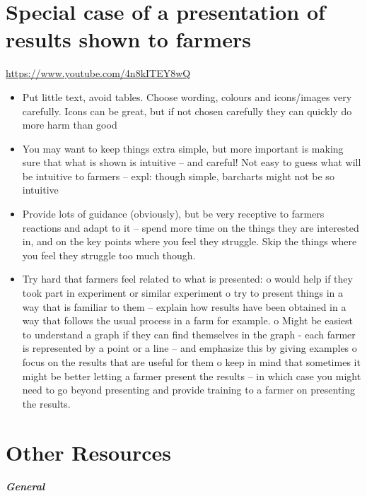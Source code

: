 \documentclass[
]{book}
\providecommand{\tightlist}{%
  \setlength{\itemsep}{0pt}\setlength{\parskip}{0pt}}
\begin{document}
\hypertarget{special-case-of-a-presentation-of-results-shown-to-farmers}{%
\section{Special case of a presentation of results shown to farmers}\label{special-case-of-a-presentation-of-results-shown-to-farmers}}

\label{fig:unnamed-chunk-33}\url{https://www.youtube.com/4n8kITEY8wQ}

\begin{itemize}
\tightlist
\item
  Put little text, avoid tables. Choose wording, colours and icons/images very carefully. Icons can be great, but if not chosen carefully they can quickly do more harm than good
\item
  You may want to keep things extra simple, but more important is making sure that what is shown is intuitive -- and careful! Not easy to guess what will be intuitive to farmers -- expl: though simple, barcharts might not be so intuitive
\item
  Provide lots of guidance (obviously), but be very receptive to farmers reactions and adapt to it -- spend more time on the things they are interested in, and on the key points where you feel they struggle. Skip the things where you feel they struggle too much though.
\item
  Try hard that farmers feel related to what is presented:
  o would help if they took part in experiment or similar experiment
  o try to present things in a way that is familiar to them -- explain how results have been obtained in a way that follows the usual process in a farm for example.
  o Might be easiest to understand a graph if they can find themselves in the graph - each farmer is represented by a point or a line -- and emphasize this by giving examples
  o focus on the results that are useful for them
  o keep in mind that sometimes it might be better letting a farmer present the results -- in which case you might need to go beyond presenting and provide training to a farmer on presenting the results.
\end{itemize}

\hypertarget{other-resources-2}{%
\section{Other Resources}\label{other-resources-2}}

\textbf{\emph{General}}
\end{document}
